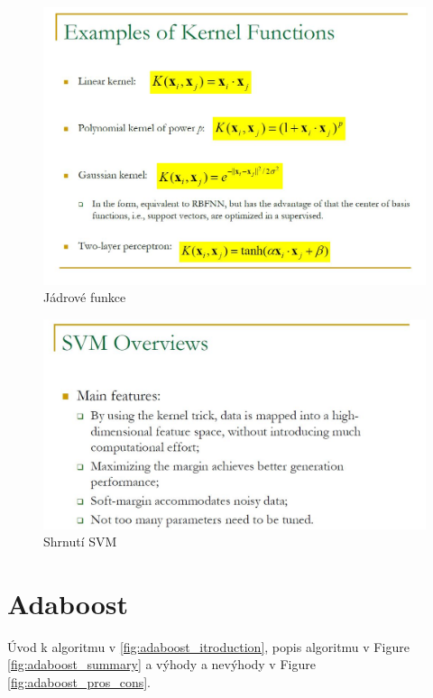 \documentclass{article}
\begin{document}
\begin{figure}[h]
\begin{center}
\includegraphics[width=12cm]{kernel_examples.jpg}
\caption{Jádrové funkce}
\label{fig:kernel_examples}
\end{center}
\end{figure}

\begin{figure}[h]
\begin{center}
\includegraphics[width=12cm]{overall_summary.jpg}
\caption{Shrnutí SVM}
\label{fig:overall_summary}
\end{center}
\end{figure}

\section{Adaboost}
Úvod k algoritmu v \ref{fig:adaboost_itroduction}, popis algoritmu v Figure \ref{fig:adaboost_summary} a výhody a nevýhody v Figure \ref{fig:adaboost_pros_cons}.
\end{document}
